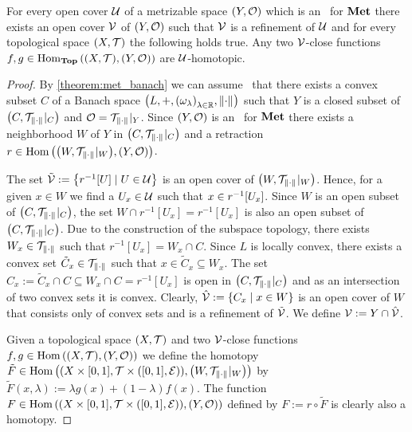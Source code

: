 \begin{theorem}
	For every open cover $\cover$ of a metrizable space $\tspace[Y][O]$ which is an \anr\ for $\Met$ there exists an open cover $\cover[V]$ of $\tspace[Y][O]$ such that $\cover[V]$ is a refinement of $\cover$ and for every topological space $\tspace$ the following holds true. Any two $\cover[V]$-close functions $f,g \in \Hom_\Top\pbraces{\tspace, \tspace[Y][O]}$ are $\cover$-homotopic. 
\end{theorem}
\begin{proof}
	By \ref{theorem:met_banach} we can assume \Wlog\ that there exists a convex subset $C$ of a Banach space $\tvspace[\norm{\cdot}]{\R}$ such that $Y$ is a closed subset of $\pbraces{C, \mathcal{T}_{\norm{\cdot}}\vert_C}$ and $\mathcal{O} = \mathcal{T}_{\norm{\cdot}}\vert_Y$. Since $\tspace[Y][O]$ is an \anr\ for $\Met$ there exists a neighborhood $W$ of $Y$ in $\pbraces{C, \mathcal{T}_{\norm{\cdot}}\vert_C}$ and a retraction $r \in \Hom\pbraces{\pbraces{W, \mathcal{T}_{\norm{\cdot}}\vert_W}, \tspace[Y][O]}$. 
	
	The set $\tilde{\cover[V]} := \Bbraces{r^{-1}[U] \mid U \in \cover}$ is an open cover of $\pbraces{W, \mathcal{T}_{\norm{\cdot}}\vert_W}$. Hence, for a given $x \in W$ we find a $U_x \in \cover$ such that $x \in r^{-1}\bbraces{U_x}$. Since $W$ is an open subset of $\pbraces{C, \mathcal{T}_{\norm{\cdot}}\vert_C}$, the set $W \cap r^{-1}[U_x] = r^{-1}[U_x]$ is also an open subset of $\pbraces{C, \mathcal{T}_{\norm{\cdot}}\vert_C}$. Due to the construction of the subspace topology, there exists $W_x \in \mathcal{T}_{\norm{\cdot}}$ such that $r^{-1}[U_x] = W_x \cap C$. Since $L$ is locally convex, there exists a convex set $\tilde{C}_x \in \mathcal{T}_{\norm{\cdot}}$ such that $x \in \tilde{C}_x \subseteq W_x$. The set $C_x := \tilde{C}_x \cap C \subseteq W_x \cap C = r^{-1}[U_x]$ is open in $\pbraces{C, \mathcal{T}_{\norm{\cdot}}\vert_C}$ and as an intersection of two convex sets it is convex. Clearly, $\hat{\cover[V]} := \Bbraces{C_x \mid x \in W}$ is an open cover of $W$ that consists only of convex sets and is a refinement of $\tilde{\cover[V]}$. We define $\cover[V] := Y \cap \hat{\cover[V]}$. 
	
	Given a topological space $\tspace$ and two $\cover[V]$-close functions $f,g \in \Hom\pbraces{\tspace, \tspace[Y][O]}$ we define the homotopy $\tilde{F} \in \Hom\pbraces{\prodtspace, \pbraces{W, \mathcal{T}_{\norm{\cdot}}\vert_W}}$ by $\tilde{F}(x, \lambda) := \lambda g(x) + (1 - \lambda) f(x)$. The function $F \in \Hom\pbraces{\prodtspace, \tspace[Y][O]}$ defined by $F := r \circ \tilde{F}$ is clearly also a homotopy. 
	

\end{proof}
